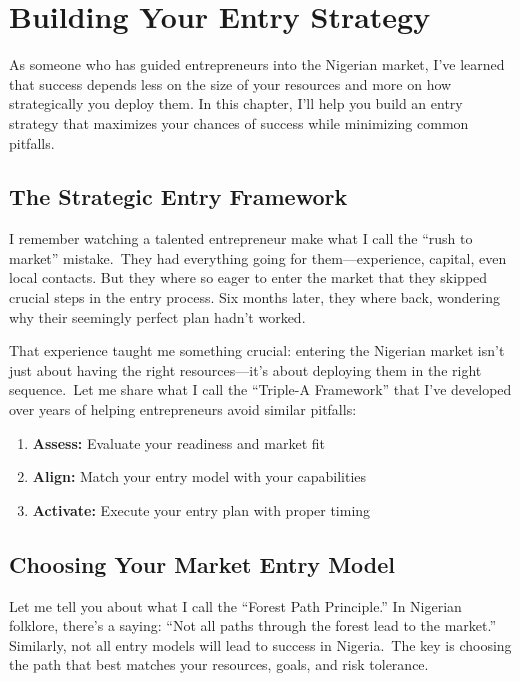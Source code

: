 \chapter{Building Your Entry Strategy}\label{ch:building-your-entry-strategy}

As someone who has guided entrepreneurs into the Nigerian market, I've learned that success depends less on the size of your resources and more on how strategically you deploy them. In this chapter, I'll help you build an entry strategy that maximizes your chances of success while minimizing common pitfalls.

\section{The Strategic Entry Framework}\label{sec:the-strategic-entry-framework}

I remember watching a talented entrepreneur make what I call the ``rush to market'' mistake.\ They had everything going for them—experience, capital, even local contacts. But they where so eager to enter the market that they skipped crucial steps in the entry process. Six months later, they where back, wondering why their seemingly perfect plan hadn't worked.

That experience taught me something crucial: entering the Nigerian market isn't just about having the right resources—it's about deploying them in the right sequence.\ Let me share what I call the ``Triple-A Framework'' that I've developed over years of helping entrepreneurs avoid similar pitfalls:

\begin{enumerate}
    \item \textbf{Assess:} Evaluate your readiness and market fit
    \item \textbf{Align:} Match your entry model with your capabilities
    \item \textbf{Activate:} Execute your entry plan with proper timing
\end{enumerate}

\section{Choosing Your Market Entry Model}\label{sec:choosing-your-market-entry-model}

Let me tell you about what I call the ``Forest Path Principle.'' In Nigerian folklore, there's a saying: ``Not all paths through the forest lead to the market.'' Similarly, not all entry models will lead to success in Nigeria.\ The key is choosing the path that best matches your resources, goals, and risk tolerance.

